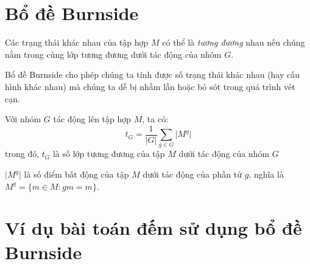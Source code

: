 \section{Bổ đề Burnside}

Các trạng thái khác nhau của tập hợp $M$ có thể là \textit{tương đương} nhau nếu chúng nằm trong cùng lớp tương đương dưới tác động của nhóm $G$.

Bổ đề Burnside cho phép chúng ta tính được số trạng thái khác nhau (hay cấu hình khác nhau) mà chúng ta dễ bị nhầm lẫn hoặc bỏ sót trong quá trình vét cạn.

\begin{lemma}[Bổ đề Burnside]
    Với nhóm $G$ tác động lên tập hợp $M$, ta có:
    \[t_G = \frac{1}{\lvert G \rvert} \sum_{g \in G} \lvert M^g \rvert \]
    trong đó, $t_G$ là số lớp tương đương của tập $M$ dưới tác động của nhóm $G$

    $\lvert M^g \rvert$ là số điểm bất động của tập $M$ dưới tác động của phần tử $g$, nghĩa là $M^g = \{ m \in M : gm = m\}$.
\end{lemma}

\section{Ví dụ bài toán đếm sử dụng bổ đề Burnside}

